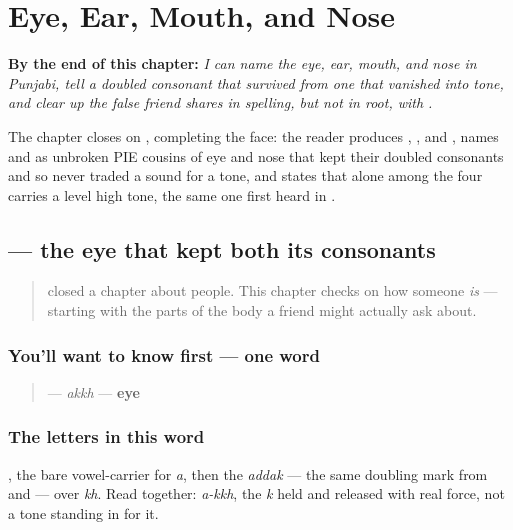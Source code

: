 
\chapter{Eye, Ear, Mouth, and Nose}
\label{ch:pa-face-parts}

\begin{chapteropening}
\textbf{By the end of this chapter:} \emph{I can name the eye, ear, mouth, and nose in Punjabi, tell a doubled consonant that survived from one that vanished into tone, and clear up the false friend  shares in spelling, but not in root, with .}

The chapter closes on , completing the face: the reader produces , ,  and , names  and  as unbroken PIE cousins of eye and nose that kept their doubled consonants and so never traded a sound for a tone, and states that  alone among the four carries a level high tone, the same one first heard in .
\end{chapteropening}

\section[\texorpdfstring{\pa{ਅੱਖ} (akkh)}{ਅੱਖ (akkh)}]{ — the eye that kept both its consonants}

\label{lesson:PA-C12-akkh}



\begin{quote}
\textbf{} closed a chapter about people. This chapter checks on how someone \emph{is} — starting with the parts of the body a friend might actually ask about.
\end{quote}

\subsection*{You'll want to know first — one word}
\begin{quote}
\textbf{} — \emph{akkh} — \textbf{eye}
\end{quote}

\subsection*{The letters in this word}
\textbf{}, the bare vowel-carrier for \emph{a}, then the \textbf{} \emph{addak} — the same doubling mark from \textbf{} and \textbf{} — over \textbf{} \emph{kh}. Read together: \emph{a-kkh}, the \emph{k} held and released with real force, not a tone standing in for it.

